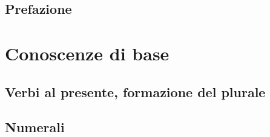 \documentclass{book}
\title{\q{   }}
\author{Thorsten Renk \and Giovanni Lovato \\ \q{}}
\date{Versione 3.0 (\today)}
\begin{document}
\frontmatter
\maketitle
\tableofcontents

\chapter{Prefazione}


\mainmatter
\part{Conoscenze di base}
\chapter{Verbi al presente, formazione del plurale}



\appendix
\chapter{}


\chapter{Numerali}


\backmatter
\end{document}
